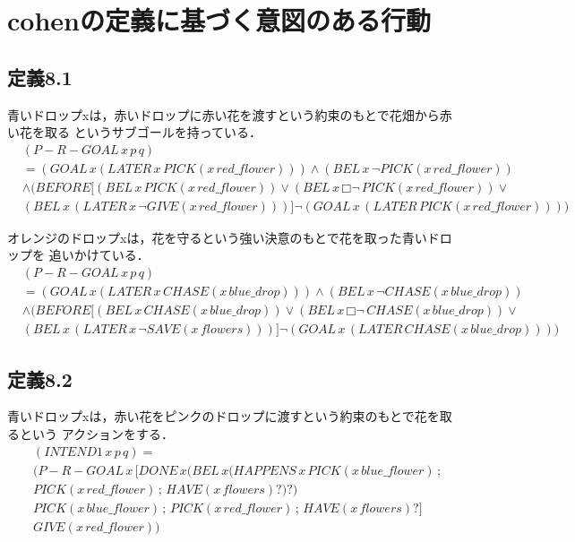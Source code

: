 \documentclass[a4]{jsarticle}
\begin{document}
\section{cohenの定義に基づく意図のある行動}
\subsection{定義8.1}
青いドロップxは，赤いドロップに赤い花を渡すという約束のもとで花畑から赤い花を取る
というサブゴールを持っている．
\begin{align*}
	&(P-R-GOAL \, x \, p \, q) \\
	&= (GOAL \, x (LATER \, x \, PICK(x \, red\_flower))) \land (BEL \, x \, \neg PICK(x \, red\_flower)) \\
	&\land (BEFORE [(BEL \, x \, PICK(x \, red\_flower)) \lor (BEL \, x \, □ \neg \, PICK(x \, red\_flower)) \lor \\
	&(BEL \, x \, (LATER \, x \, \neg GIVE(x \, red\_flower)))] \neg (GOAL \, x \, (LATER \, PICK(x \, red\_flower))))
\end{align*}

オレンジのドロップxは，花を守るという強い決意のもとで花を取った青いドロップを
追いかけている．
\begin{align*}
	&(P-R-GOAL \, x \, p \, q) \\
	&= (GOAL \, x (LATER \, x \, CHASE(x \, blue\_drop))) \land (BEL \, x \, \neg CHASE(x \, blue\_drop)) \\
	&\land (BEFORE [(BEL \, x \, CHASE(x \, blue\_drop)) \lor (BEL \, x \, □ \neg \, CHASE(x \, blue\_drop)) \lor \\
	&(BEL \, x \, (LATER \, x \, \neg SAVE(x \, flowers)))] \neg (GOAL \, x \, (LATER \, CHASE(x \, blue\_drop))))
\end{align*}

\subsection{定義8.2}
青いドロップxは，赤い花をピンクのドロップに渡すという約束のもとで花を取るという
アクションをする．
\begin{align*}
	&(INTEND1 \, x \, p \, q) = \\
	&(P-R-GOAL \, x \, [DONE \, x (BEL \, x (HAPPENS \, x \, PICK(x \, blue\_flower) \, ; \\
	&PICK(x \, red\_flower) \, ; \, HAVE(x \, flowers)?)?) \\
	&PICK(x \, blue\_flower) \, ; \, PICK(x \, red\_flower) \, ; \, HAVE(x \, flowers)?] \\
	&GIVE(x \, red\_flower))
\end{align*}
\end{document}
